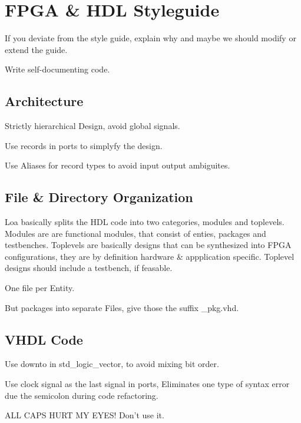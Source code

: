 \chapter{FPGA \& HDL Styleguide}

If you deviate from the style guide, explain why and maybe we should modify or extend the guide.

Write self-documenting code.



\section{Architecture}
Strictly hierarchical Design, avoid global signals.

Use records in ports to simplyfy the design.

Use Aliases for record types to avoid input output ambiguites.

\section{File \& Directory Organization}


Loa basically splits the HDL code into two categories, modules and toplevels. Modules are are functional modules, that consist of enties, packages and testbenches. 
Toplevels are basically designs that can be synthesized into FPGA configurations, they are by definition hardware \& appplication specific. Toplevel designs should include a testbench, if feasable.

One file per Entity.

But packages into separate Files, give those the suffix \_pkg.vhd.

\section{VHDL Code}


Use downto in std\_logic\_vector, to avoid mixing bit order.


Use clock signal as the last signal in ports, Eliminates one type of syntax error due the semicolon during code refactoring.


ALL CAPS HURT MY EYES! Don't use it.



